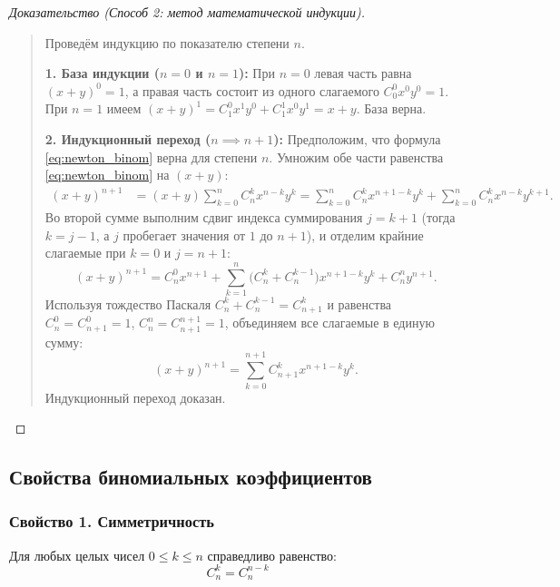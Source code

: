 \begin{proof}[Доказательство (Способ 2: метод математической индукции)]~\\
    \begin{quote}
        Проведём индукцию по показателю степени $n$.

        \textbf{1. База индукции ($n = 0$ и $n = 1$):} 
        При $n = 0$ левая часть равна $(x + y)^0 = 1$, а правая часть 
        состоит из одного слагаемого $C_0^0 x^0 y^0 = 1$. При $n = 1$ имеем 
        $(x + y)^1 = C_1^0 x^1 y^0 + C_1^1 x^0 y^1 = x + y$. База верна.

        \textbf{2. Индукционный переход ($n \implies n + 1$):} 
        Предположим, что формула \eqref{eq:newton_binom} верна для степени 
        $n$. Умножим обе части равенства \eqref{eq:newton_binom} на 
        $(x + y)$:
        \begin{align*}
            (x + y)^{n+1} &= (x + y) \sum_{k=0}^{n} C_n^k x^{n-k} y^k = 
            \sum_{k=0}^{n} C_n^k x^{n+1-k} y^k + 
            \sum_{k=0}^{n} C_n^k x^{n-k} y^{k+1}.
        \end{align*}
        Во второй сумме выполним сдвиг индекса суммирования $j = k + 1$ 
        (тогда $k = j - 1$, а $j$ пробегает значения от $1$ до $n + 1$), и 
        отделим крайние слагаемые при $k = 0$ и $j = n + 1$:
        \[
            (x + y)^{n+1} = C_n^0 x^{n+1} + 
            \sum_{k=1}^{n} \bigl(C_n^k + C_n^{k-1}\bigr) x^{n+1-k} y^k + 
            C_n^n y^{n+1}.
        \]
        Используя тождество Паскаля $C_n^k + C_n^{k-1} = C_{n+1}^k$ и 
        равенства $C_n^0 = C_{n+1}^0 = 1$, $C_n^n = C_{n+1}^{n+1} = 1$, 
        объединяем все слагаемые в единую сумму:
        \[
            (x + y)^{n+1} = \sum_{k=0}^{n+1} C_{n+1}^k x^{n+1-k} y^k.
        \]
        Индукционный переход доказан.
    \end{quote}
\end{proof}

\subsection{Свойства биномиальных коэффициентов}

\subsubsection{Свойство 1. Симметричность}

\begin{proposition}
    Для любых целых чисел $0 \le k \le n$ справедливо равенство:
    \begin{equation} \label{eq:binom_sym}
        C_n^k = C_n^{n-k} \tag{2}
    \end{equation}
\end{proposition}

